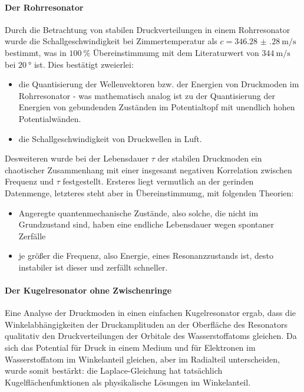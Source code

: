 \documentclass[../main.tex]{subfiles}
\begin{document}
\paragraph{Der Rohrresonator}
    Durch die Betrachtung von stabilen Druckverteilungen in einem Rohrresonator wurde die Schallgeschwindigkeit bei Zimmertemperatur als $c=\SI{346.28(28)}{\metre\per\second}$ bestimmt, was in $\SI{100}{\%}$ Übereinstimmumg mit dem Literaturwert von $\SI{344}{\metre\per\second}$ bei $\SI{20}{\degree}$ ist. Dies bestätigt zweierlei:
    \begin{itemize}
        \item die Quantisierung der Wellenvektoren bzw. der Energien von Druckmoden im Rohrresonator - was mathematisch analog ist zu der Quantisierung der Energien von gebundenden Zuständen im Potentialtopf mit unendlich hohen Potentialwänden.
        \item die Schallgeschwindigkeit von Druckwellen in Luft. 
    \end{itemize}

    Desweiteren wurde bei der Lebensdauer $\tau$ der stabilen Druckmoden ein chaotischer Zusammenhang mit einer insgesamt negativen Korrelation zwischen Frequenz und $\tau$ festgestellt. Ersteres liegt vermutlich an der gerinden Datenmenge, letzteres steht aber in Übereinstimmumg, mit folgenden Theorien:
    \begin{itemize}
        \item Angeregte quantenmechanische Zustände, also solche, die nicht im Grundzustand sind, haben eine endliche Lebensdauer wegen spontaner Zerfälle
        \item je größer die Frequenz, also Energie, eines Resonanzzustands ist, desto instabiler ist dieser und zerfällt schneller.
    \end{itemize}


\paragraph{Der Kugelresonator ohne Zwischenringe}
    Eine Analyse der Druckmoden in einen einfachen Kugelresonator ergab, dass die Winkelabhängigkeiten der Druckamplituden an der Oberfläche des Resonators qualitativ den Druckverteilungen der Orbitale des Wasserstoffatoms gleichen. Da sich das Potential für Druck in einem Medium und für Elektronen im Wasserstoffatom im Winkelanteil gleichen, aber im Radialteil unterscheiden, wurde somit bestärkt: die Laplace-Gleichung hat tatsächlich Kugelflächenfunktionen als physikalische Lösungen im Winkelanteil.\\
\end{document}
